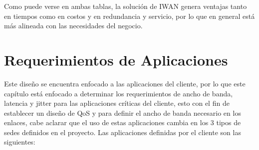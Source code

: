 Como puede verse en ambas tablas, la solución de IWAN genera ventajas tanto en tiempos como en costos y en redundancia y servicio, por lo que en general está más alineada con las necesidades del negocio.

\section{Requerimientos de Aplicaciones} %
\label{sec:Requerimientos de Aplicaciones}

Este diseño se encuentra enfocado a las aplicaciones del cliente, por lo que este capítulo está enfocado a determinar los requerimientos de ancho de banda, latencia y jitter para las aplicaciones críticas del cliente, esto con el fin de establecer un diseño de QoS y para definir el ancho de banda necesario en los enlaces, cabe aclarar que el uso de estas aplicaciones cambia en los 3 tipos de sedes definidos en el proyecto. Las aplicaciones definidas por el cliente son las siguientes:
